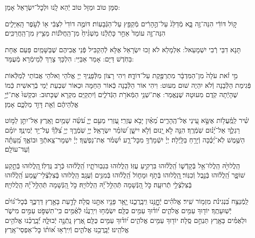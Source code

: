 \documentclass[twoside, openany, parskip=half, 11pt]{book}
\begin{document}
סִמָּן טוֹב וּמַזָּל טוֹב יְֿהֵא לָֽנוּ וּלְכׇל־יִשְׂרָאֵל אָמֵן:

ק֣וֹל דּוֹדִ֔י הִנֵּה־זֶ֖ה בָּ֑א מְֿדַלֵּג֙ עַל־הֶ֣הָרִ֔ים מְֿקַפֵּ֖ץ עַל־הַגְּֿבָעֽוֹת׃ דּוֹמֶ֤ה דוֹדִי֙ לִצְבִ֔י א֖וֹ לְֿעֹ֣פֶר הָֽאַיָּלִ֑ים הִנֵּה־זֶ֤ה עוֹמֵד֙ אַחַ֣ר כָּתְֿלֵ֔נוּ מַשְׁגִּ֨יחַ֙ מִן־הַֽחֲלֹּנ֔וֹת מֵצִ֖יץ מִן־הַֽחֲרַכִּֽים׃

תָּנָא דִבֵּי רְֿבִי יִשְׁמָעֵאל: אִלְמָלֵא לֹא זָכוּ יִשְׂרָאֵל אֶלָּא לְֿהַקְבִּיל פְּֿנֵי אֲבִיהֶם שֶׁבַּשָּׁמַֽיִם פַּעַם אֶחָת בַּחֹֽדֶשׁ דַּיָּם: אָמַר אַבַּיֵּי: הִלְכָּךְ צָרֵךְ לְֿמֵימְֿרָא מְֿעֻמָּד:

מִ֣י זֹ֗את עֹלָה֙ מִן־הַמִּדְבָּ֔ר מִתְרַפֶּ֖קֶת עַל־דּוֹדָ֑הּ׃
וִיהִי רָצוֹן מִלְּֿפָנֶֽיךָ יְיָ אֱלֹהַי וֵאלֹהֵי אֲבוֹתַי לְֿמַלְּֿאוֹת פְּֿגִימַת הַלְּֿבָנָה וְֿלֹא יִהְיֶה שׁוּם מִעוּט: וִיהִי אוֹר הַלְּֿבָנָה כְּֿאוֹר הַחַמָּה וּכְאוֹר שִׁבְעַת יְֿמֵי בְֿרֵאשִׁית כְּֿמוֹ שֶׁהָיְֿתָה קֹֽדֶם מִעוּטָהּ שֶׁנֶּאֱמַר:
אֶת־שְׁנֵ֥י הַמְּֿאֹרֹ֖ת הַגְּֿדֹלִ֑ים וְֿיִתְקַיַּם מִקְרָא שֶׁכָּתוּב: וּבִקְשׁוּ֙ אֶת־יְֿיָ֣ אֱלֹֽהֵיהֶ֔ם וְֿאֵ֖ת דָּוִ֣ד מַלְכָּ֑ם אָמֵן׃


שִׁ֗יר לַֽמַּֽ֫עֲל֥וֹת אֶשָּׂ֣א עֵ֭ינַי אֶל־הֶֽהָרִ֑ים מֵ֝אַ֗יִן יָבֹ֥א עֶזְרִֽי׃ עֶ֭זְרִי מֵעִ֣ם יְיָ֑ עֹ֝שֵׂ֗ה שָׁמַ֥יִם וָאָֽרֶץ׃ אַל־יִתֵּ֣ן לַמּ֣וֹט רַגְלֶ֑ךָ אַל־יָ֝נ֗וּם שֹֽׁמְֿרֶֽךָ׃ הִנֵּ֤ה לֹ֣א יָ֭נוּם וְֿלֹ֣א יִישָׁ֑ן שׁ֝וֹמֵ֗ר יִשְׂרָאֵֽל׃ יְיָ֥ שֹֽׁמְֿרֶ֑ךָ יְיָ֥ צִ֝לְּֿךָ֗ עַל־יַ֥ד יְֿמִינֶֽךָ׃ יוֹמָ֗ם הַשֶּׁ֥מֶשׁ לֹֽא־יַ֝כֶּ֗כָּה וְֿיָרֵ֥חַ בַּלָּֽיְֿלָה׃ יְיָ֗ יִשְֿׁמָרְֿךָ֥ מִכׇּל־רָ֑ע יִ֝שְׁמֹ֗ר אֶת־נַפְשֶֽׁךָ׃ יְיָ֗ יִשְׁמָר־צֵֽאתְֿךָ֥ וּבוֹאֶ֑ךָ מֵֽ֝עַתָּ֗ה וְֿעַד־עוֹלָֽם׃

הַֽלֲלוּיָ֙הּ הַֽלֲלוּ־אֵ֥ל בְּֿקָדְֿשׁ֑וֹ הַֽ֝לֲל֗וּהוּ בִּרְקִ֥יעַ עֻזּֽוֹ׃
הַֽלֲלוּהוּ בִּגְבֽוּרֹתָ֑יו הַֽ֝לֲל֗וּהוּ כְּֿרֹ֣ב גֻּדְלֽוֹ׃
֖הַֽלֲלוּהוּ בְּֿתֵ֣קַע שׁוֹפָ֑ר הַֽ֝לֲל֗וּהוּ בְּֿנֵ֣בֶל וְֿכִנּֽוֹר׃
֖הַֽלֲלוּהוּ בְּֿתֹ֣ף וּמָח֑וֹל הַֽ֝לֲל֗וּהוּ בְּֿמִנִּ֥ים וְֿעֻגָֽב׃
הַֽלֲלוּהוּ בְּֽֿצִלְצְֿלֵי־שָׁ֑מַע הַֽ֝לֲל֗וּהוּ בְּֽֿצִלְצְֿלֵ֥י תְֿרוּעָֽה׃
כֹּ֣ל הַ֭נְּֿשָׁמָה תְּֿהַלֵּ֥ל ֝יָ֗הּ הַֽלֲלוּיָֽהּ׃
כֹּ֣ל הַ֭נְּֿשָׁמָה תְּֿהַלֵּ֥ל ֝יָ֗הּ הַֽלֲלוּיָֽהּ׃

\enlargethispage{\baselineskip}
לַֽמְֿנַצֵּ֥ח
בִּ֝נְגִינֹ֗ת מִזְמ֥וֹר שִֽׁיר׃ אֱלֹהִ֗ים יְֿחׇׇׇׇָנֵּ֥נוּ וִֽיבָֽרֲכֵ֑נוּ יָ֤אֵ֥ר פָּנָ֖יו אִתָּ֣נוּ סֶֽלָה׃ לָדַ֣עַת בָּאָ֣רֶץ דַּרְכֶּ֑ךָ בְּֿכׇל־גּ֝וֹיִ֗ם יְֿשֽׁוּעָתֶֽךָ׃ יוֹד֖וּךָ עַמִּ֥ים אֱלֹהִ֑ים י֝וֹד֗וּךָ עַמִּ֥ים כֻּלָּֽם׃ יִשְׂמְֿח֥וּ וִירַֽנֲנ֗וּ לְֿאֻ֫מִּ֥ים כִּֽי־תִשְׁפֹּ֣ט עַמִּ֣ים מִישֹׁ֑ר וּלְאֻמִּ֓ים בָּאָ֖רֶץ תַּנְחֵ֣ם סֶֽלָה׃ יוֹד֖וּךָ עַמִּ֥ים אֱלֹהִ֑ים י֝וֹד֗וּךָ עַמִּ֥ים כֻּלָּֽם׃ אֶ֭רֶץ נָֽתְֿנָ֣ה יְֿבוּלָ֑הּ יְֿ֝בָֽרֲכֵ֗נוּ אֱלֹהִ֥ים אֱלֹהֵֽינוּ׃ יְֿבָֽרֲכֵ֥נוּ אֱלֹהִ֑ים וְֿיִֽירְֿא֥וּ א֝וֹת֗וֹ כׇּל־אַפְסֵי־אָֽרֶץ׃
\end{document}
